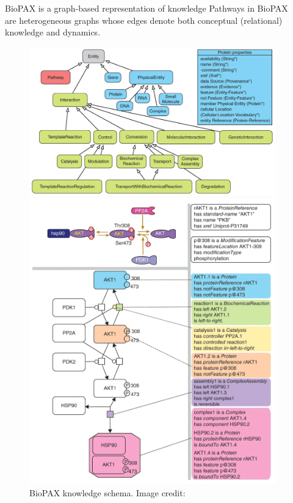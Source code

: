 \documentclass[final]{beamer}
\newlength{\sepwidth}
\newlength{\colwidth}
\newcommand{\separatorcolumn}{\begin{column}{\sepwidth}\end{column}}
\begin{document}
\begin{frame}[t,fragile]
\begin{columns}[t]
\separatorcolumn

\begin{column}{\colwidth}  
  \begin{exampleblock}{BioPAX is a graph-based representation of knowledge}
    Pathways in BioPAX \cite{demir2010biopax} are heterogeneous graphs whose edges denote both conceptual (relational) knowledge and dynamics.
    \begin{figure}
      \centering
      \begin{minipage}{0.4\textwidth}
        \footnotesize
        \includegraphics[scale=0.45]{Image/biopax_schema.jpg}
        \caption{BioPAX knowledge schema.  Image credit: \cite{demir2010biopax}}
      \end{minipage}
      \hspace{2.5cm}
      \begin{minipage}{0.4\textwidth}
        \footnotesize
        \includegraphics[scale=0.35]{Image/biopax_akt.jpg}

\end{minipage}
\end{figure}
\end{exampleblock}
\end{column}
\end{columns}
\end{frame}
\end{document}
